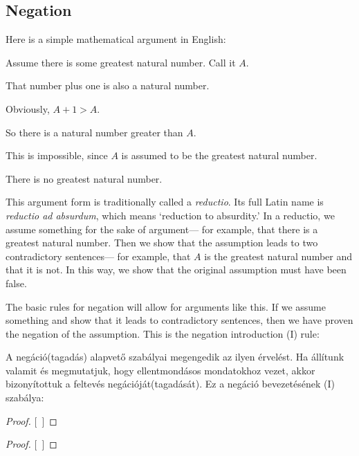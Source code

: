 \subsection{Negation}
Here is a simple mathematical argument in English:
\begin{earg}
\item[] Assume there is some greatest natural number. Call it $A$.
\item[] That number plus one is also a natural number.
\item[] Obviously, $A+1 > A$.
\item[] So there is a natural number greater than $A$.
\item[] This is impossible, since $A$ is assumed to be the greatest natural number.
\item[\therefore] There is no greatest natural number.
\end{earg}
This argument form is traditionally called a \emph{reductio}. Its full Latin name is \emph{reductio ad absurdum}, which means `reduction to absurdity.' In a reductio, we assume something for the sake of argument--- for example, that there is a greatest natural number. Then we show that the assumption leads to two contradictory sentences--- for example, that $A$ is the greatest natural number and that it is not. In this way, we show that the original assumption must have been false.



The basic rules for negation will allow for arguments like this. If we assume something and show that it leads to contradictory sentences, then we have proven the negation of the assumption. This is the negation introduction ({\enot}I) rule:

A negáció(tagadás) alapvető szabályai megengedik az ilyen érvelést. Ha állítunk valamit és megmutatjuk, hogy ellentmondásos mondatokhoz vezet, akkor bizonyítottuk a feltevés negációját(tagadását). Ez a negáció bevezetésének ({\enot}I) szabálya:

\begin{proof}
\open
\close
{}[\ ]{\enot{}}
\end{proof}

\begin{proof}
\open
\close
{}[\ ]{\enot{}}
\end{proof}

